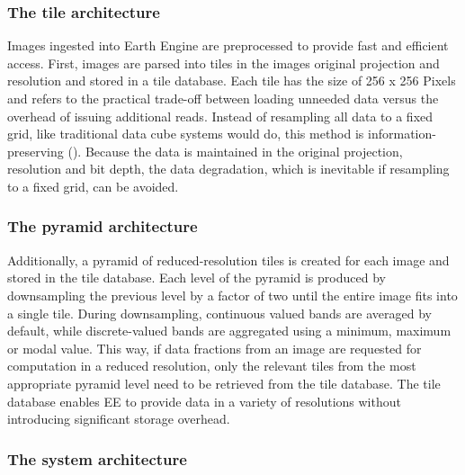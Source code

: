 \subsubsection{The tile architecture}

Images ingested into Earth Engine are preprocessed to provide fast and efficient access. First, images are parsed into tiles in the images original projection and resolution and stored in a tile database. Each tile has the size of 256 x 256 Pixels and refers to the practical trade-off between loading unneeded data versus the overhead of issuing additional reads. Instead of resampling all data to a fixed grid, like traditional data cube systems would do, this method is information-preserving (\cite{gray1997data}). Because the data is maintained in the original projection, resolution and bit depth, the data degradation, which is inevitable if resampling to a fixed grid, can be avoided.

\subsubsection{The pyramid architecture}

Additionally, a pyramid of reduced-resolution tiles is created for each image and stored in the tile database. Each level of the pyramid is produced by downsampling the previous level by a factor of two until the entire image fits into a single tile. During downsampling, continuous valued bands are averaged by default, while discrete-valued bands are aggregated using a minimum, maximum or modal value. This way, if data fractions from an image are requested for computation in a reduced resolution, only the relevant tiles from the most appropriate pyramid level need to be retrieved from the tile database. The tile database enables EE to provide data in a variety of resolutions without introducing significant storage overhead.

\subsubsection{The system architecture}

